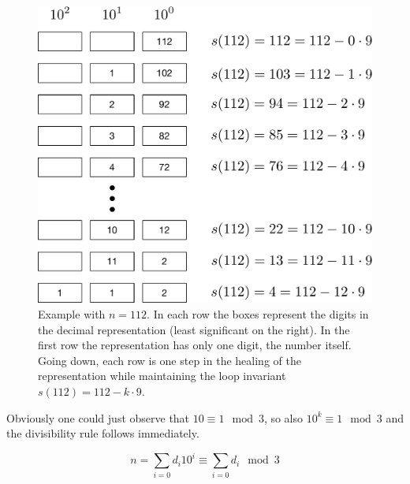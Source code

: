 \begin{figure}
\includegraphics[scale=0.5]{example.pdf}
\caption{Example with $n=112$. In each row the boxes represent the digits in the decimal representation (least significant on the right). In the first row the representation has only one digit, the number itself. Going down, each row is one step in the healing of the representation while maintaining the loop invariant $s(112) = 112 - k \cdot 9$.}
\end{figure}

Obviously one could just observe that $10 \equiv 1 \mod 3$, so also $10^k \equiv 1 \mod 3$ and the divisibility rule follows immediately. 

$$
n = \sum_{i = 0} d_i 10^i \equiv \sum_{i = 0} d_i \mod 3
$$
